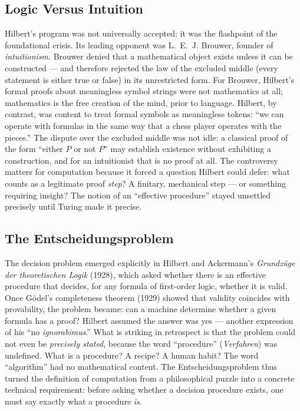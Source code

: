 \subsection{Logic Versus Intuition}
\label{sec:computation:logic_vs_intuition}

Hilbert's program was not universally accepted; it was the flashpoint of the foundational crisis. Its leading opponent was L.~E.~J. Brouwer, founder of \emph{intuitionism}. Brouwer denied that a mathematical object exists unless it can be constructed --- and therefore rejected the law of the excluded middle (every statement is either true or false) in its unrestricted form. For Brouwer, Hilbert's formal proofs about meaningless symbol strings were not mathematics at all; mathematics is the free creation of the mind, prior to language. Hilbert, by contrast, was content to treat formal symbols as meaningless tokens: ``we can operate with formulas in the same way that a chess player operates with the pieces.'' The dispute over the excluded middle was not idle: a classical proof of the form ``either $P$ or not $P$'' may establish existence without exhibiting a construction, and for an intuitionist that is no proof at all. The controversy matters for computation because it forced a question Hilbert could defer: what counts as a legitimate proof \emph{step}? A finitary, mechanical step --- or something requiring insight? The notion of an ``effective procedure'' stayed unsettled precisely until Turing made it precise.

\subsection{The Entscheidungsproblem}
\label{sec:computation:entscheidungsproblem}

The decision problem emerged explicitly in Hilbert and Ackermann's \emph{Grundz\"uge der theoretischen Logik} (1928), which asked whether there is an effective procedure that decides, for any formula of first-order logic, whether it is valid. Once G\"odel's completeness theorem (1929) showed that validity coincides with provability, the problem became: can a machine determine whether a given formula has a proof? Hilbert assumed the answer was yes --- another expression of his ``no \emph{ignorabimus}.'' What is striking in retrospect is that the problem could not even be \emph{precisely stated}, because the word ``procedure'' (\emph{Verfahren}) was undefined. What is a procedure? A recipe? A human habit? The word ``algorithm'' had no mathematical content. The Entscheidungsproblem thus turned the definition of computation from a philosophical puzzle into a concrete technical requirement: before asking whether a decision procedure exists, one must say exactly what a procedure \emph{is}.

